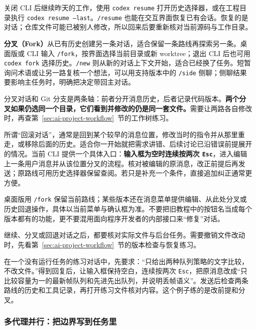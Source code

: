 关闭 CLI 后继续昨天的工作，使用 \texttt{codex resume} 打开历史选择器，或在工程目录执行 \texttt{codex resume --last}。\texttt{/resume} 也能在交互界面恢复已有会话。恢复的是对话；仓库文件可能已被别人修改，所以回来后要重新核对当前源码与工作目录。

\textbf{分叉（Fork）}从已有历史创建另一条对话，适合保留一条路线再探索另一条。桌面版或 CLI 输入 \texttt{/fork}，按界面选择当前目录或新 worktree；退出 CLI 后也可用 \texttt{codex fork} 选择历史。\texttt{/new} 则从新的对话上下文开始，适合已经换了任务。短暂询问术语或让另一路复核一个想法，可以用支持版本中的 \texttt{/side} 侧聊；侧聊结果要影响主任务时，明确把决定带回主对话。

分叉对话和 Git 分支是两条轴：前者分开消息历史，后者记录代码版本。\textbf{两个分叉如果仍选同一个目录，它们看到并修改的仍是同一套文件。}需要让两路各自修改时，再查第~\ref{sec:ai-project-workflow}~节的工作树练习。

所谓“回滚对话”，通常是回到某个较早的消息位置，修改当时的指令并从那里重走，或移除后面的历史。适合你一开始就把需求讲错、后续讨论已沿错误前提展开的情况。当前 CLI 提供一个具体入口：\textbf{输入框为空时连续按两次 \texttt{Esc}}，进入编辑上一条用户消息并从该位置分叉的流程。核对被编辑的原消息，改正前提后再发送；原路线可用历史选择器保留查阅。若只是补充一个条件，直接追加纠正通常更方便。

桌面版用 \texttt{/fork} 保留当前路线；某些版本还在消息菜单提供编辑、从此处分叉或历史回退操作，具体以当前菜单与确认框为准。不要把旧教程中的按钮名当成每个版本都有的功能，更不要混用面向程序开发者的内部接口来“修复”对话。


\begin{note}
继续、分叉或回退对话之后，都要核对实际文件与后台任务。需要撤销文件改动时，先看第~\ref{sec:ai-project-workflow}~节的版本检查与恢复练习。
\end{note}

\begin{example}
在一个没有运行任务的练习对话中，先要求：“只给出两种队列策略的文字比较，不改文件。”得到回复后，让输入框保持空白，连续按两次 \texttt{Esc}，把原消息改成“只比较容量为一的最新帧队列和先进先出队列，并说明丢帧语义”。发送后检查两条路线的历史和工具记录，再打开练习文件核对内容。这个例子练的是改前提和分叉。
\end{example}

\subsubsection{多代理并行：把边界写到任务里}

